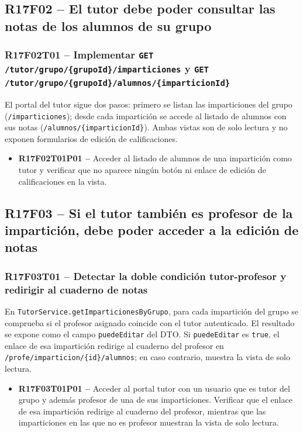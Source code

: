 \documentclass[12pt, a4paper]{report}
\begin{document}
\subsection{R17F02 -- El tutor debe poder consultar las notas de los alumnos de su grupo}

\subsubsection{R17F02T01 -- Implementar \texttt{GET /tutor/grupo/\{grupoId\}/imparticiones} y \texttt{GET /tutor/grupo/\{grupoId\}/alumnos/\{imparticionId\}}}
El portal del tutor sigue dos pasos: primero se listan las imparticiones del grupo (\texttt{/imparticiones}); desde cada impartición se accede al listado de alumnos con sus notas (\texttt{/alumnos/\{imparticionId\}}). Ambas vistas son de solo lectura y no exponen formularios de edición de calificaciones.
\begin{itemize}
  \item \textbf{R17F02T01P01 --} Acceder al listado de alumnos de una impartición como tutor y verificar que no aparece ningún botón ni enlace de edición de calificaciones en la vista.
\end{itemize}

\subsection{R17F03 -- Si el tutor también es profesor de la impartición, debe poder acceder a la edición de notas}

\subsubsection{R17F03T01 -- Detectar la doble condición tutor-profesor y redirigir al cuaderno de notas}
En \texttt{TutorService.getImparticionesByGrupo}, para cada impartición del grupo se comprueba si el profesor asignado coincide con el tutor autenticado. El resultado se expone como el campo \texttt{puedeEditar} del DTO. Si \texttt{puedeEditar} es \texttt{true}, el enlace de esa impartición redirige al cuaderno del profesor en \texttt{/profe/imparticion/\{id\}/alumnos}; en caso contrario, muestra la vista de solo lectura.
\begin{itemize}
  \item \textbf{R17F03T01P01 --} Acceder al portal tutor con un usuario que es tutor del grupo y además profesor de una de sus imparticiones. Verificar que el enlace de esa impartición redirige al cuaderno del profesor, mientras que las imparticiones en las que no es profesor muestran la vista de solo lectura.
\end{itemize}
\end{document}
